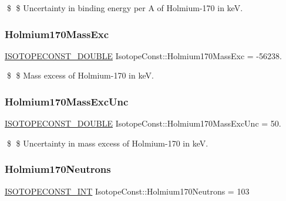 \$ \$ Uncertainty in binding energy per A of Holmium-\/170 in keV. \mbox{\label{group___isotope_const-_holmium-_ho170_gaa858ff5001ba82aec75addb0a4a43c96}} 
\subsubsection{\texorpdfstring{Holmium170\+Mass\+Exc}{Holmium170MassExc}}
{\footnotesize\ttfamily \mbox{\hyperlink{group___isotope_const-_macros_ga8f45a7272ce02c0b4c65c44636ed719a}{I\+S\+O\+T\+O\+P\+E\+C\+O\+N\+S\+T\+\_\+\+D\+O\+U\+B\+LE}} Isotope\+Const\+::\+Holmium170\+Mass\+Exc = -\/56238.}

\$ \$ Mass excess of Holmium-\/170 in keV. \mbox{\label{group___isotope_const-_holmium-_ho170_ga44d74d5c52d5149e84726b245a53470d}} 
\subsubsection{\texorpdfstring{Holmium170\+Mass\+Exc\+Unc}{Holmium170MassExcUnc}}
{\footnotesize\ttfamily \mbox{\hyperlink{group___isotope_const-_macros_ga8f45a7272ce02c0b4c65c44636ed719a}{I\+S\+O\+T\+O\+P\+E\+C\+O\+N\+S\+T\+\_\+\+D\+O\+U\+B\+LE}} Isotope\+Const\+::\+Holmium170\+Mass\+Exc\+Unc = 50.}

\$ \$ Uncertainty in mass excess of Holmium-\/170 in keV. \mbox{\label{group___isotope_const-_holmium-_ho170_ga717d8c9dee590d6aa3fc011b188b8fd1}} 
\subsubsection{\texorpdfstring{Holmium170\+Neutrons}{Holmium170Neutrons}}
{\footnotesize\ttfamily \mbox{\hyperlink{group___isotope_const-_macros_ga5f18360b3e99483a35c32d789e62621c}{I\+S\+O\+T\+O\+P\+E\+C\+O\+N\+S\+T\+\_\+\+I\+NT}} Isotope\+Const\+::\+Holmium170\+Neutrons = 103}

